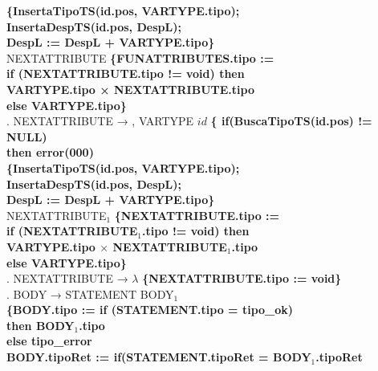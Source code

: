\begin{tabbing}
    \textbf{\{InsertaTipoTS(id.pos, VARTYPE.tipo);}\\
    \>                    \>        \>\textbf{InsertaDespTS(id.pos, DespL);}\\
    \>                    \>        \>\textbf{DespL := DespL + VARTYPE.tipo\}}\\
    \>                    \>NEXTATTRIBUTE \textbf{\{FUNATTRIBUTES.tipo :=}\\
    \>                    \>                      \> \textbf{if (NEXTATTRIBUTE.tipo != void) then}\\
    \>                    \>                      \> \>\textbf{VARTYPE.tipo × NEXTATTRIBUTE.tipo}\\
    \>                    \>                      \> \textbf{else VARTYPE.tipo\}}\\
    . NEXTATTRIBUTE → , VARTYPE $id$ \textbf{\{
    if(BuscaTipoTS(id.pos) != NULL)} \\
    \>              \>          \>
    \>\textbf{then error(000)}\\
    \>              \>          \>
    \textbf{\{InsertaTipoTS(id.pos, VARTYPE.tipo);}\\
    \>                    \>        \>\textbf{InsertaDespTS(id.pos, DespL);}\\
    \>                    \>        \>\textbf{DespL := DespL + VARTYPE.tipo\}}\\
    \>                    \>NEXTATTRIBUTE$_1$ \textbf{\{NEXTATTRIBUTE.tipo :=}\\
    \>                    \>                      \> \textbf{if (NEXTATTRIBUTE$_1$.tipo != void) then}\\
    \>                    \>                      \> \>\textbf{VARTYPE.tipo $\times$ NEXTATTRIBUTE$_1$.tipo}\\
    \>                    \>                      \> \textbf{else VARTYPE.tipo\}}\\
    . NEXTATTRIBUTE → $\lambda$ \textbf{\{NEXTATTRIBUTE.tipo := void\}}\\
    . BODY → STATEMENT BODY$_1$\\
    \>                    \>\textbf{\{BODY.tipo := if (STATEMENT.tipo = tipo\_ok)}\\
    \>                    \>           \>          \>\textbf{then BODY$_1$.tipo}\\
    \>                    \>           \>\textbf{else tipo\_error}\\
    \>                    \>\textbf{BODY.tipoRet := if(STATEMENT.tipoRet = BODY$_1$.tipoRet}\\

\end{tabbing}

